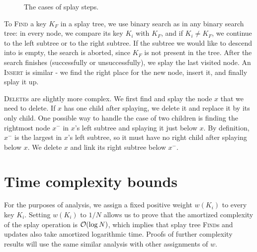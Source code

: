 \begin{figure}

\caption{The cases of splay steps.}
\end{figure}


To \textsc{Find} a key $K_F$ in a splay tree, we use binary search as in any
binary search tree: in every node, we compare its key $K_i$ with $K_F$, and
if $K_i \neq K_F$, we continue to the left subtree or to the right subtree.
If the subtree we would like to descend into is empty, the search is aborted,
since $K_F$ is not present in the tree.
After the search finishes (successfully or unsuccessfully), we splay the last
visited node. An \textsc{Insert} is similar - we find the right place for the
new node, insert it, and finally splay it up.

\textsc{Delete}s are slightly more complex. We first find and splay the node $x$
that we need to delete. If $x$ has one child after splaying, we delete it and
replace it by its only child. One possible way to handle the case of two
children is finding the rightmost node $x^-$ in $x$'s left subtree and splaying
it just below $x$. By definition, $x^-$ is the largest in $x$'s left subtree,
so it must have no right child after splaying below $x$. We delete $x$ and link
its right subtree below $x^-$.

\section{Time complexity bounds}
For the purposes of analysis, we assign a fixed positive weight $w(K_i)$
to every key $K_i$. Setting $w(K_i)$ to $1/N$ allows us to prove that
the amortized complexity of the splay operation is $\mathcal{O}(\log N)$, which implies
that splay tree \textsc{Find}s and updates also take amortized logarithmic time.
Proofs of further complexity results will use the same similar analysis with
other assignments of $w$.

